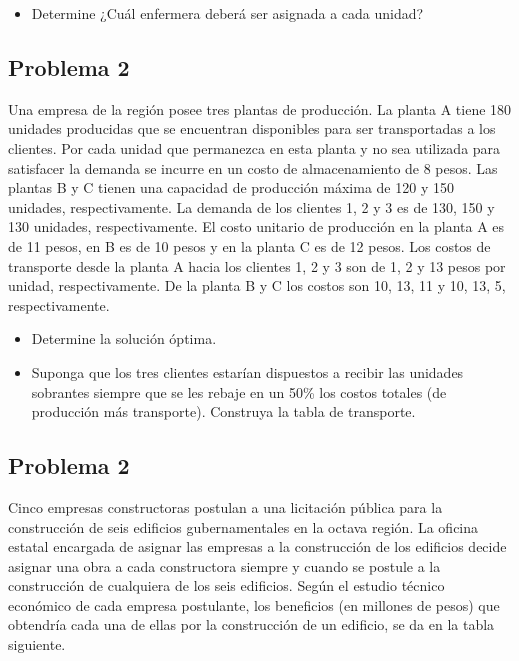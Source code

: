 \documentclass[letterpaper]{article}
\begin{document}
\begin{itemize}
\item Determine ¿Cuál enfermera deberá ser asignada a cada unidad?
\end{itemize}
\subsection*{Problema 2}
Una empresa de la región posee tres plantas de producción. La planta A tiene 180 unidades producidas que se encuentran disponibles para ser transportadas a los clientes. Por cada unidad que permanezca en esta planta y no sea utilizada para satisfacer la demanda se incurre en un costo de almacenamiento de 8 pesos. Las plantas B y C tienen una capacidad de producción máxima de 120 y 150 unidades, respectivamente. La demanda de los clientes 1, 2 y 3 es de 130, 150 y 130 unidades, respectivamente. El costo unitario de producción en la planta A es de 11 pesos, en B es de 10 pesos y en la planta C es de 12 pesos. Los costos de transporte desde la planta A hacia los clientes 1, 2 y 3 son de 1, 2 y 13 pesos por unidad, respectivamente. De la planta B y C los costos son 10, 13, 11 y 10, 13, 5, respectivamente. 

\begin{itemize}
\item Determine la solución óptima.
\item Suponga que los tres clientes estarían dispuestos a recibir las unidades sobrantes siempre que se les rebaje en un 50\% los costos totales (de producción más transporte). Construya la tabla de transporte.
\end{itemize}

\subsection*{Problema 2}
Cinco empresas constructoras postulan a una licitación pública para la construcción de seis edificios gubernamentales en la octava región. La oficina estatal encargada de asignar las empresas a la construcción de los edificios decide asignar una obra a cada constructora siempre y cuando se postule a la construcción de cualquiera de los seis edificios. Según el estudio técnico económico de cada empresa postulante, los beneficios (en millones de pesos) que obtendría cada una de ellas por la construcción de un edificio, se da en la tabla siguiente.
\end{document}
